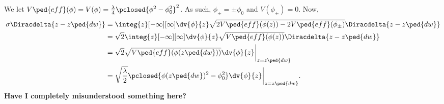 We let $V\ped{eff}(\phi)= V(\phi)=\frac{\lambda}{4}\pclosed{\phi^2 -\phi_0^2}^2$. As such, $\phi_\pm = \pm \phi_0$ and $V(\phi_\pm)=0$. Now,
\begin{equation}\label{eq:thinwall:sigma_delta_wrong}
    \begin{split}
        \sigma \Diracdelta{z-z\ped{dw}} &= \integ{z}[-\infty][\infty] \dv{\phi}{z} \sqrt{2V\ped{eff}(\phi(z)) - 2 V\ped{eff}(\phi_{\pm})} \Diracdelta{z-z\ped{dw}} \\
        &= \sqrt{2} \integ{z}[-\infty][\infty] \dv{\phi}{z} \sqrt{V\ped{eff}(\phi(z))}\Diracdelta{z-z\ped{dw}} \\
        &= \sqrt{2} \sqrt{V\ped{eff}(\phi(z\ped{dw}))}  \dv{\phi}{z} \bigg|_{z=z\ped{dw}} \\
        &= \sqrt{\frac{\lambda}{2}} \pclosed{\phi(z\ped{dw})^2-\phi_0^2} \dv{\phi}{z} \bigg|_{z=z\ped{dw}} .
    \end{split}
\end{equation}
\textcolor{uioblue}{\textbf{Have I completely misunderstood something here?}} 





